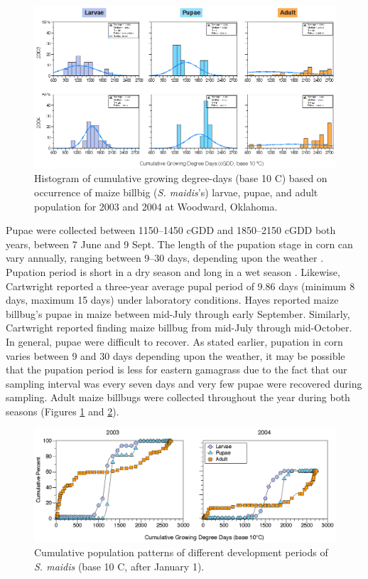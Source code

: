 \documentclass[agronomy,article,submit,moreauthors,pdftex,10pt,a4paper]{mdpi}
\theoremstyle{mdpi}
\newcounter{ex}
\newcounter{re}
\theoremstyle{mdpidefinition}
\begin{document}
\begin{figure}
  \includegraphics[width=\linewidth]{Fig1.eps}
  \caption{Histogram of cumulative growing degree-days (base 10 \degree C) based on occurrence of maize billbig (\textit{S. maidis}’s) larvae, pupae, and adult population for 2003 and 2004 at Woodward, Oklahoma.}
  \label{fig:f1}
\end{figure}



Pupae were collected between 1150–1450 cGDD and 1850–2150 cGDD both years, between 7 June and 9 Sept. The length of the pupation stage in corn can vary annually, ranging between 9–30 days, depending upon the weather \cite{hayes1916}. Pupation period is short in a dry season and long in a wet season \cite{hayes1916}. Likewise, Cartwright \cite{cwright1929} reported a three-year average pupal period of 9.86 days (minimum 8 days, maximum 15 days) under laboratory conditions. Hayes \cite{hayes1916} reported maize billbug’s pupae in maize between mid-July through early September. Similarly, Cartwright \cite{cwright1929} reported finding maize billbug from mid-July through mid-October. In general, pupae were difficult to recover. As stated earlier, pupation in corn varies between 9 and 30 days depending upon the weather, it may be possible that the pupation period is less for eastern gamagrass due to the fact that our sampling interval was every seven days and very few pupae were recovered during sampling. Adult maize billbugs were collected throughout the year during both seasons (Figures \ref{fig:f1} and \ref{fig:f2}).

\begin{figure}
  \includegraphics[width=\linewidth]{Fig2.eps}
  \caption{Cumulative population patterns of different development periods of \textit{S. maidis} (base 10 \degree C, after January 1).}
  \label{fig:f2}
\end{figure}
\end{document}
